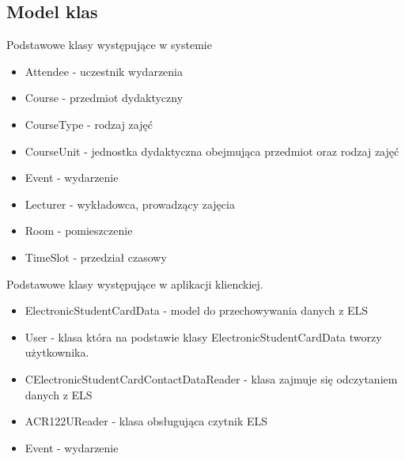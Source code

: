 \subsection{Model klas}
Podstawowe klasy występujące w systemie
\begin{itemize}
    \item Attendee - uczestnik wydarzenia
    \item Course - przedmiot dydaktyczny
    \item CourseType - rodzaj zajęć
    \item CourseUnit - jednostka dydaktyczna obejmująca przedmiot oraz rodzaj zajęć
    \item Event - wydarzenie
    \item Lecturer - wykładowca, prowadzący zajęcia
    \item Room - pomieszczenie
    \item TimeSlot - przedział czasowy
\end{itemize}
Podstawowe klasy występujące w aplikacji klienckiej.
\begin{itemize}
    \item ElectronicStudentCardData - model do przechowywania danych z ELS
    \item User - klasa która na podstawie klasy ElectronicStudentCardData tworzy użytkownika.
    \item CElectronicStudentCardContactDataReader - klasa zajmuje się odczytaniem danych z ELS
    \item ACR122UReader - klasa obsługująca czytnik ELS
    \item Event - wydarzenie
\end{itemize}




 
